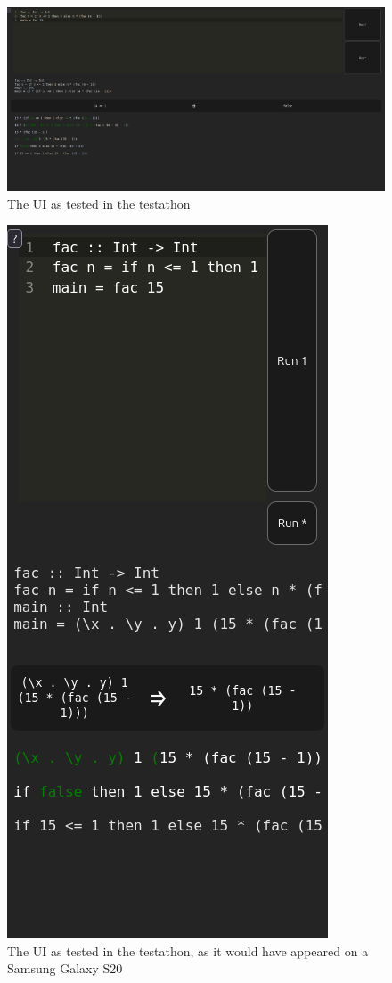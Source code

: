 \begin{figure}[h]
    \centering
    \includegraphics[width=1\linewidth]{images/product_at_testathon.png}
    \caption{The UI as tested in the testathon}
    \label{fig:screenshot_testathon}
\end{figure}

\begin{figure}
    \centering
    \includegraphics[width=0.5\linewidth]{images/testathon-mobile.png}
    \caption{The UI as tested in the testathon, as it would have appeared on a Samsung Galaxy S20}
    \label{fig:screenshot_testathon_mobile}
\end{figure}

